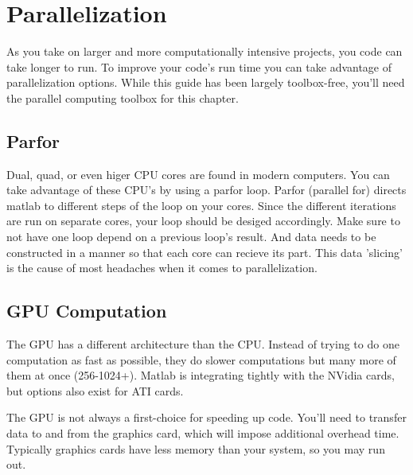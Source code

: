 
\pagebreak
\section{Parallelization}
As you take on larger and more computationally intensive projects, you code can take longer to run.
 To improve your code's run time you can take advantage of parallelization options.
 While this guide has been largely toolbox-free, you'll need the parallel computing toolbox for this chapter.

\subsection{Parfor}
Dual, quad, or even higer CPU cores are found in modern computers.
 You can take advantage of these CPU's by using a parfor loop.
 Parfor (parallel for) directs matlab to different steps of the loop on your cores.
 Since the different iterations are run on separate cores, your loop should be desiged accordingly.
 Make sure to not have one loop depend on a previous loop's result.
 And data needs to be constructed in a manner so that each core can recieve its part.
 This data 'slicing' is the cause of most headaches when it comes to parallelization.

\begin{quote}

\end{quote}

\pagebreak
\subsection{GPU Computation}
The GPU has a different architecture than the CPU.
 Instead of trying to do one computation as fast as possible, they do slower computations but many more of them at once (256-1024+).
 Matlab is integrating tightly with the NVidia cards, but options also exist for ATI cards.

The GPU is not always a first-choice for speeding up code.
 You'll need to transfer data to and from the graphics card, which will impose additional overhead time.
 Typically graphics cards have less memory than your system, so you may run out.

\begin{quote}
 
\end{quote}
